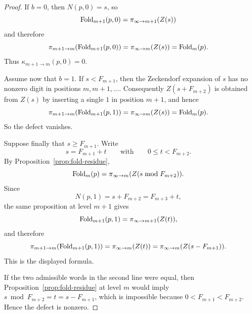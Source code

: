 \begin{proof}
If $b=0$, then $N(p,0)=s$, so
\[
\operatorname{Fold}_{m+1}(p,0)=\pi_{\infty\to m+1}(Z(s))
\]
and therefore
\[
\pi_{m+1\to m}(\operatorname{Fold}_{m+1}(p,0))
=
\pi_{\infty\to m}(Z(s))
=
\operatorname{Fold}_m(p).
\]
Thus $\kappa_{m+1\to m}(p,0)=0$.

Assume now that $b=1$.  If $s<F_{m+1}$, then the Zeckendorf expansion of $s$
has no nonzero digit in positions $m,m+1,\dots$.  Consequently
$Z(s+F_{m+2})$ is obtained from $Z(s)$ by inserting a single $1$ in position
$m+1$, and hence
\[
\pi_{m+1\to m}(\operatorname{Fold}_{m+1}(p,1))
=
\pi_{\infty\to m}(Z(s))
=
\operatorname{Fold}_m(p).
\]
So the defect vanishes.

Suppose finally that $s\ge F_{m+1}$.  Write
\[
s=F_{m+1}+t
\qquad\text{with}\qquad
0\le t<F_{m+2}.
\]
By Proposition~\ref{prop:fold-residue},
\[
\operatorname{Fold}_m(p)=\pi_{\infty\to m}(Z(s\bmod F_{m+2})).
\]
Since
\[
N(p,1)=s+F_{m+2}=F_{m+3}+t,
\]
the same proposition at level $m+1$ gives
\[
\operatorname{Fold}_{m+1}(p,1)=\pi_{\infty\to m+1}(Z(t)),
\]
and therefore
\[
\pi_{m+1\to m}(\operatorname{Fold}_{m+1}(p,1))
=
\pi_{\infty\to m}(Z(t))
=
\pi_{\infty\to m}(Z(s-F_{m+1})).
\]
This is the displayed formula.

If the two admissible words in the second line were equal, then
Proposition~\ref{prop:fold-residue} at level $m$ would imply
$s\bmod F_{m+2}=t=s-F_{m+1}$, which is impossible because
$0<F_{m+1}<F_{m+2}$.  Hence the defect is nonzero.
\end{proof}

